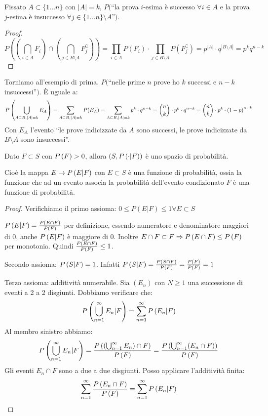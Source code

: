 Fissato $A \subset \{ 1 \dots n \}$ con $|A| = k$, $P($``la prova $i$-esima \`e successo $\forall  i \in A$ e la prova $j$-esima \`e insuccesso $\forall  j \in \{1 \dots n \} \setminus A$''$)$.

\begin{proof}
\[
P \left( \left( \bigcap_{i \in A} F_i \right) \cap \left( \bigcap_{j \in B \setminus A} F_j^{\complement} \right) \right) = 
\prod_{i \in A} P(F_i) \cdot \prod_{j \in B \setminus A} P(F_{j}^{\complement}) = p^{|A|} \cdot q^{|B \setminus A|} = p^k q^{n-k}
\]
\end{proof}

Torniamo all'esempio di prima. $P($``nelle prime $n$ prove ho $k$ successi e $n-k$ insuccessi''$)$. \`E uguale a:
\[
P \left( \bigcup_{A \subset B, \left\lvert{A}\right\rvert = k} E_A \right) =
\sum_{A \subset B, \left\lvert{A}\right\rvert = k} P(E_A) = \sum_{A \subset B, \left\lvert{A}\right\rvert = k} p^k \cdot q^{n - k} =
\binom{n}{k} \cdot p^k \cdot q^{n - k} =
\binom{n}{k} \cdot p^k \cdot {(1 - p)}^{n - k}
\]
Con $E_A$ l'evento ``le prove indicizzate da $A$ sono successi, le prove indicizzate da $B \setminus A$ sono insuccessi''.

\begin{prop}
Dato $F \subset S$ con $P \left( {F} \right) > 0$, allora $(S, P \left( \cdot | F \right))$ \`e uno spazio di probabilit\`a.

Cio\`e la mappa $E \to P \left( E | F \right)$ con $E \subset S$ \`e una funzione di probabilit\`a, ossia la funzione che ad un evento associa la probabilit\`a dell'evento condizionato $F$ \`e una funzione di probabilit\`a.
\end{prop}
\begin{proof}
Verifichiamo il primo assioma: $0 \le P(E|F) \le 1 \forall E \subset S$

$P \left( E | F \right) = \frac{P \left( {E \cap F} \right)}{P \left( {F} \right)}$ per definizione, essendo numeratore e denominatore maggiori di 0, anche $P \left( E | F \right)$ \`e maggiore di 0. Inoltre $E \cap F \subset F \Rightarrow P \left( {E \cap F} \right) \le P \left( {F} \right)$ per monotonia. Quindi $\frac{ P \left( {E \cap F} \right) }{P \left( {F} \right)} \le 1$.

Secondo assioma: $P \left( S | F \right) = 1$. Infatti $ P \left( S | F \right) = \frac{P \left( {S \cap F} \right)}{P \left( {F} \right)} = \frac{P \left( {F} \right)}{P \left( {F} \right)} = 1$

Terzo assioma: additivit\`a numerabile. Sia $(E_n)$ con $N \ge 1$ una successione di eventi a 2 a 2 disgiunti. Dobbiamo verificare che:
\[
P \left( \bigcup_{n = 1}^{\infty} E_n | F \right) = \sum_{n = 1}^{\infty} P \left( E_n | F \right)
\]
Al membro sinistro abbiamo:
\[
P \left( \bigcup_{n = 1}^{\infty} E_n | F \right) = \frac{P \left( {\left( \bigcup_{n = 1}^{\infty} E_n \right) \cap F} \right)}{P \left( {F} \right)} = \frac{ P \left( { \bigcup_{n = 1}^{\infty} (E_n \cap F)} \right)}{P \left( {F} \right)}
\]
Gli eventi $E_n \cap F$ sono a due a due disgiunti. Posso applicare l'additivit\`a finita:
\[
\sum_{n = 1}^{\infty} \frac{P \left( {E_n \cap F} \right)}{P \left( {F} \right)} = \sum_{n=1}^{\infty} P \left( E_n | F \right)
\]
\end{proof}

